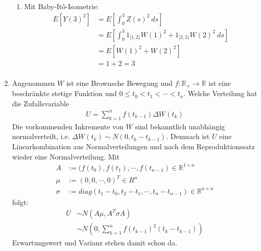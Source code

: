 \documentclass[a4paper,11pt,notitlepage,fullpage]{article}
\newcommand{\R}{\mathbb R}
\begin{document}
\begin{enumerate}
\begin{enumerate}
\item Mit Baby-Itô-Isometrie:
\begin{align*}
E\left[Y(3)^2\right] &= E\left[\int_0^3 Z(s)^2 ~ds\right] \\
&= E\left[\int_0^3 1_{[1, 2)} W(1)^2 + 1_{[2, 3)} W(2)^2 ~ds\right] \\
&= E\left[W(1)^2 + W(2)^2\right] \\
&= 1 + 2 = 3 \\
\end{align*}

\end{enumerate}


\item Angenommen $W$ ist eine Brownsche Bewegung und $f: \R_+ \to \R$ ist eine beschränkte stetige Funktion und $0 \leq t_0 < t_1 < \cdots < t_n$. Welche Verteilung hat die Zufallsvariable
\begin{align*}
U = \sum_{k=1}^n f(t_{k-1})\Delta W(t_k)
\end{align*}
Die vorkommenden Inkremente von $W$ sind bekanntlich unabhängig normalverteilt, i.e. $\Delta W(t_k) \sim N(0, t_k - t_{k-1})$. Demnach ist $U$ eine Linearkombination aus Normalverteilungen und nach dem Reproduktionssatz wieder eine Normalverteilung. Mit
\begin{align*}
A &:= (f(t_0), f(t_1), \cdots, f(t_{n-1}) \in \R^{1\times n} \\
\mu &:= (0, 0, \cdots, 0)^T \in R^n \\
\sigma &:= diag(t_1 - t_0, t_2 - t_1, \cdots, t_n - t_{n-1}) \in \R^{n\times n}
\end{align*}
folgt:
\begin{align*}
U &\sim N\left(A\mu, A^T \sigma A\right) \\
&\sim N\left(0, \sum_{k=1}^n f(t_{k-1})^2(t_k - t_{k-1})\right)
\end{align*}
Erwartungswert und Varianz stehen damit schon da.


\end{enumerate}
\end{document}
